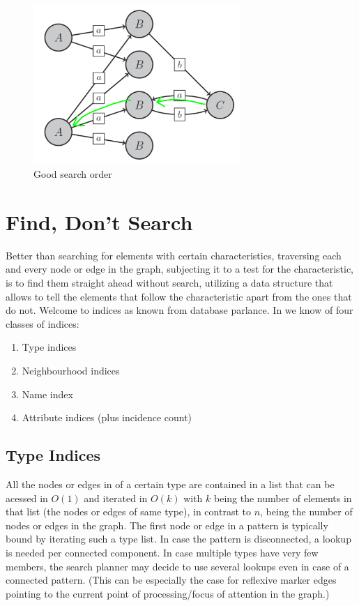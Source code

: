 \begin{figure}[p]
  \centering
  \includegraphics[width=0.7\textwidth]{fig/GraphGood}
  \caption{Good search order}
  \label{perf:figgoodsearch}
\end{figure}


\section{Find, Don't Search}
Better than searching for elements with certain characteristics, 
traversing each and every node or edge in the graph, 
subjecting it to a test for the characteristic,
is to find them straight ahead without search,
utilizing a data structure that allows to tell the elements that follow the characteristic apart from the ones that do not.
Welcome to indices as known from database parlance.
In \GrG{} we know of four classes of indices:
\begin{enumerate}
	\item Type indices
	\item Neighbourhood indices
	\item Name index
	\item Attribute indices (plus incidence count)
\end{enumerate}

\subsection{Type Indices}
All the nodes or edges in \GrG{} of a certain type are contained in a list that can be acessed in $O(1)$ and iterated in $O(k)$ with $k$ being the number of elements in that list (the nodes or edges of same type), in contrast to $n$, being the number of nodes or edges in the graph.
The first node or edge in a pattern is typically bound by iterating such a type list.
In case the pattern is disconnected, a lookup is needed per connected component.
In case multiple types have very few members, the search planner may decide to use several lookups even in case of a connected pattern.
(This can be especially the case for reflexive marker edges pointing to the current point of processing/focus of attention in the graph.)

